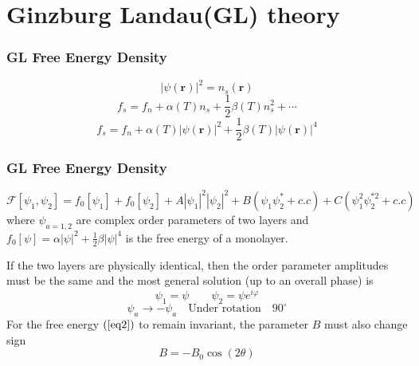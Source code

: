 \documentclass{beamer}
\begin{document}
\section{Ginzburg Landau(GL) theory}
\begin{frame}
\frametitle{GL Free Energy Density }
\begin{equation}
|\psi(\mathbf{r})|^2=n_s(\mathbf{r})
\end{equation}
\begin{equation}
f_s=f_n+\alpha(T)n_s+\frac{1}{2}\beta(T)n_s^2+\cdots
\end{equation}
\begin{equation}
f_s=f_n+\alpha(T)|\psi(\mathbf{r})|^2+\frac{1}{2}\beta(T)|\psi(\mathbf{r})|^4
\end{equation}
\end{frame}
\begin{frame}
\frametitle{GL Free Energy Density}
\begin{equation}
\mathcal{F}\left[\psi_1,\psi_2\right]=f_0\left[\psi_1\right]+f_0\left[\psi_2\right]+A|\psi_1|^2|\psi_2|^2+B(\psi_1\psi_2^*+c.c)+C(\psi_1^2\psi_2^{*2}+c.c)\label{eq2}
\end{equation}
where $\psi_{a=1,2}$ are complex order parameters of two layers and $f_0\left[\psi\right]=\alpha|\psi|^2+\frac{1}{2}\beta|\psi|^4$ is the free energy of
a monolayer.

If the two layers are physically identical, then the order parameter amplitudes must be the same and the most general
solution (up to an overall phase) is
\begin{equation}
\psi_1=\psi\qquad\psi_2=\psi e^{i\varphi}
\end{equation}
\begin{equation}
\psi_a\rightarrow -\psi_a\quad\textrm{Under rotation}\quad 90^\circ
\end{equation}
For the free energy $(\ref{eq2})$ to remain invariant, the parameter $B$ must also change sign
\begin{equation}
B=-B_0\cos(2\theta)
\end{equation}
\end{frame}
\end{document}
